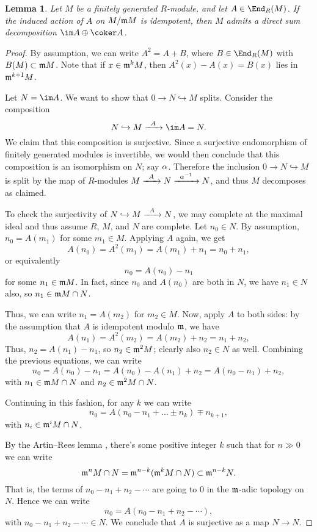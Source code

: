 \documentclass[12pt]{article}
\let\inc\hookrightarrow
\theoremstyle{theorem}
\numberwithin{thm}{section}
\newtheorem{lem}[thm]{Lemma}
\theoremstyle{definition}
\begin{document}
\begin{lem}\label{lem:idemp}
  Let $M$ be a finitely generated $R$-module, and let $A\in\End_R(M)$. If the induced action of $A$ on $M/\mathfrak m M$ is idempotent, then $M$ admits a direct sum decomposition $\im A \oplus \coker A$.
\end{lem}
\begin{proof}
  By assumption, we can write $A^2 = A + B$, where $B\in\End_R(M)$ with $B(M)\subset \mathfrak m M$.
  Note that if $x \in \mathfrak m^kM$, then $A^2(x) - A(x) = B(x)$ lies in $\mathfrak m^{k+1}M$.

  Let $N = \im A$. We want to show that $0 \to N\inc M$ splits. Consider the composition
  \[ N\inc M \xra{A} \im A = N.\]
  We claim that this composition is surjective. Since a surjective endomorphism of finitely generated modules is invertible, we would then conclude that this composition is an isomorphism on $N$; say $\alpha$.
  Therefore the inclusion \( 0 \to N \inc M \) is split by the map of $R$-modules $M\xra{A} N\xra{\a\inv} N$, and thus $M$ decomposes as claimed.

  To check the surjectivity of $N\inc M \xra{A} N$,  we may complete at the maximal ideal and thus assume $R$, $M$, and $N$ are complete. Let $n_0\in N$. By assumption, $n_0=A(m_1)$ for some $m_1\in M$. Applying $A$ again, we get
  \[ A(n_0) = A^2(m_1) = A(m_1) + n_1 = n_0 + n_1, \]
  or equivalently
  \[ n_0 = A(n_0) - n_1 \]
  for some $n_1\in \mathfrak m M$. In fact, since $n_0$ and $A(n_0)$ are both in $N$, we have $n_1\in N$ also, so $n_1\in \mathfrak m M\cap N$.

  Thus, we can write $n_1 = A(m_2)$ for $m_2\in M$.
  Now, apply $A$ to both sides: by the assumption that $A$ is idempotent modulo $\mathfrak m$, we have
  \[ A(n_1)=A^2(m_2) = A(m_2) + n_2 = n_1+n_2, \]
  Thus, $n_2=A(n_1)-n_1$, so $n_2\in \mathfrak m^2M$; clearly also $n_2\in N$ as well.
  Combining the previous equations, we can write
  \[ n_0 = A(n_0) - n_1 = A(n_0) - A(n_1) + n_2 = A(n_0 - n_1) + n_2, \]
  with $n_1\in \mathfrak m M\cap N$ and $n_2\in \mathfrak m^2M\cap N$.

  Continuing in this fashion, for any $k$ we can write
  \[ n_0=A(n_0-n_1+\dots \pm n_k) \mp n_{k+1}, \]
  with $n_i \in \mathfrak m^i M\cap N$.

  By the Artin--Rees lemma \cite[Lemma~5.1]{Eisenbud95}, there's some positive integer $k$ such that for $n\gg0$ we can write
  \[ \mathfrak m^n M\cap N = \mathfrak m^{n-k} ( \mathfrak m^kM\cap N)\subset \mathfrak m^{n-k} N. \]
  That is, the terms of $n_0-n_1+n_2-\cdots$ are going to 0 in the $\mathfrak m$-adic topology on $N$. Hence we can write
  \[ n_0=A(n_0-n_1+n_2-\cdots), \]
  with $n_0-n_1+n_2-\cdots\in N$. We conclude that $A$ is surjective as a map $N\to N$.
\end{proof}
\end{document}

